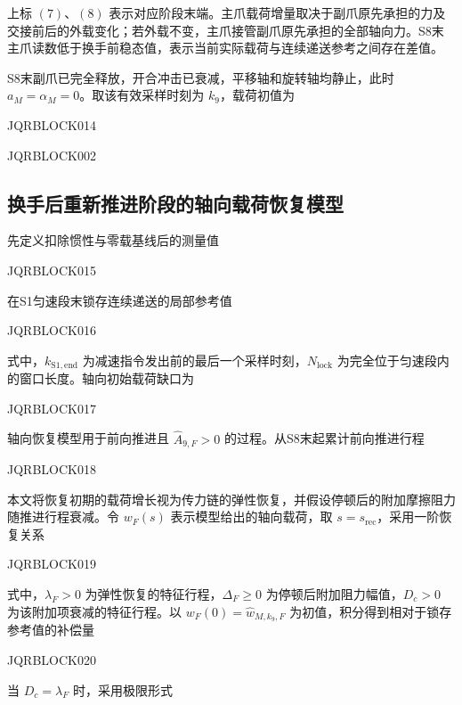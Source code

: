 上标 $(7)$、$(8)$ 表示对应阶段末端。主爪载荷增量取决于副爪原先承担的力及交接前后的外载变化；若外载不变，主爪接管副爪原先承担的全部轴向力。S8末主爪读数低于换手前稳态值，表示当前实际载荷与连续递送参考之间存在差值。





S8末副爪已完全释放，开合冲击已衰减，平移轴和旋转轴均静止，此时 $a_M=\alpha_M=0$。取该有效采样时刻为 $k_9$，载荷初值为


JQRBLOCK014









JQRBLOCK002







\subsection{换手后重新推进阶段的轴向载荷恢复模型}





先定义扣除惯性与零载基线后的测量值


JQRBLOCK015


在S1匀速段末锁存连续递送的局部参考值


JQRBLOCK016


式中，$k_{\mathrm{S1,end}}$ 为减速指令发出前的最后一个采样时刻，$N_{\mathrm{lock}}$ 为完全位于匀速段内的窗口长度。轴向初始载荷缺口为


JQRBLOCK017







轴向恢复模型用于前向推进且 $\widehat A_{9,F}>0$ 的过程。从S8末起累计前向推进行程


JQRBLOCK018


本文将恢复初期的载荷增长视为传力链的弹性恢复，并假设停顿后的附加摩擦阻力随推进行程衰减。令 $w_F(s)$ 表示模型给出的轴向载荷，取 $s=s_{\mathrm{rec}}$，采用一阶恢复关系


JQRBLOCK019


式中，$\lambda_F>0$ 为弹性恢复的特征行程，$\Delta_F\ge0$ 为停顿后附加阻力幅值，$D_c>0$ 为该附加项衰减的特征行程。以 $w_F(0)=\widehat w_{M,k_9,F}$ 为初值，积分得到相对于锁存参考值的补偿量


JQRBLOCK020


当 $D_c=\lambda_F$ 时，采用极限形式


